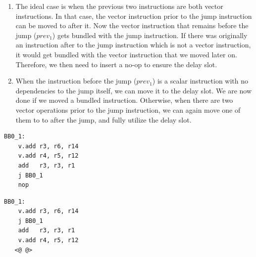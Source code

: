 \begin{enumerate}
\item The ideal case is when the previous two instructions are both vector instructions. In that case, the vector instruction prior to the jump instruction can be moved to after it. Now the vector instruction that remains before the jump ($prev_1$) gets bundled with the jump instruction. If there was originally an instruction after to the jump instruction which is not a vector instruction, it would get bundled with the vector instruction that we moved later on. Therefore, we then need to insert a no-op to ensure the delay slot. %
\item When the instruction before the jump ($prev_1$) is a scalar instruction with no dependencies to the jump itself, we can move it to the delay slot. We are now done if we moved a bundled instruction. Otherwise, when there are two vector operations prior to the jump instruction, we can again move one of them to to after the jump, and fully utilize the delay slot.

\end{enumerate}

\label{lst:delayslot2}
\begin{center}
\hspace{2px}\begin{minipage}{.475\textwidth}
\begin{lstlisting}[frame=tlrb]
BB0_1:
    v.add r3, r6, r14
    v.add r4, r5, r12
    add   r3, r3, r1
    j BB0_1
    nop
\end{lstlisting}
\end{minipage}\hfill
\begin{minipage}{.475\textwidth}
\begin{lstlisting}[frame=tlrb]
BB0_1:
    v.add r3, r6, r14
    j BB0_1
    add   r3, r3, r1
    v.add r4, r5, r12
   <@ @>
\end{lstlisting}
\end{minipage}
\end{center}

